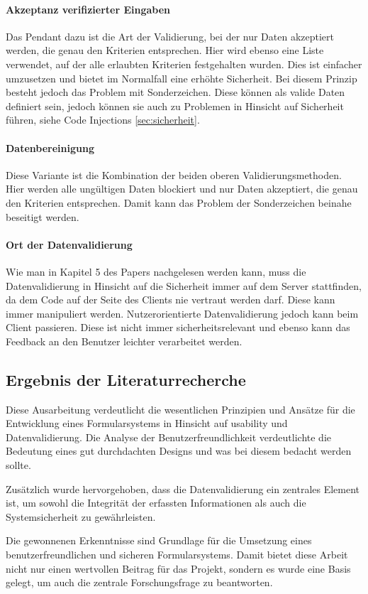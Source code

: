 \paragraph{Akzeptanz verifizierter Eingaben}
Das Pendant dazu ist die Art der Validierung, bei der nur Daten akzeptiert werden, die genau den Kriterien entsprechen. Hier wird ebenso eine Liste verwendet, auf der alle erlaubten Kriterien festgehalten wurden. Dies ist einfacher umzusetzen und bietet im Normalfall eine erhöhte Sicherheit. Bei diesem Prinzip besteht jedoch das Problem mit Sonderzeichen. Diese können als valide Daten definiert sein, jedoch können sie auch zu Problemen in Hinsicht auf Sicherheit führen, siehe Code Injections \ref{sec:sicherheit}.

\paragraph{Datenbereinigung}
Diese Variante ist die Kombination der beiden oberen Validierungsmethoden. Hier werden alle ungültigen Daten blockiert und nur Daten akzeptiert, die genau den Kriterien entsprechen. Damit kann das Problem der Sonderzeichen beinahe beseitigt werden.  

\paragraph{Ort der Datenvalidierung}
Wie man in Kapitel 5 des Papers \cite{DeVries2006} nachgelesen werden kann, muss die Datenvalidierung in Hinsicht auf die Sicherheit immer auf dem Server stattfinden, da dem Code auf der Seite des Clients nie vertraut werden darf. Diese kann immer manipuliert werden. Nutzerorientierte Datenvalidierung jedoch kann beim Client passieren. Diese ist nicht immer sicherheitsrelevant und ebenso kann das Feedback an den Benutzer leichter verarbeitet werden. 

\subsection{Ergebnis der Literaturrecherche}
Diese Ausarbeitung verdeutlicht die wesentlichen Prinzipien und Ansätze für die Entwicklung eines Formularsystems in Hinsicht auf \gls{usability} und Datenvalidierung. Die Analyse der Benutzerfreundlichkeit verdeutlichte die Bedeutung eines gut durchdachten Designs und was bei diesem bedacht werden sollte. 

Zusätzlich wurde hervorgehoben, dass die Datenvalidierung ein zentrales Element ist, um sowohl die Integrität der erfassten Informationen als auch die Systemsicherheit zu gewährleisten.

Die gewonnenen Erkenntnisse sind Grundlage für die Umsetzung eines benutzerfreundlichen und sicheren Formularsystems. Damit bietet diese Arbeit nicht nur einen wertvollen Beitrag für das Projekt, sondern es wurde eine Basis gelegt, um auch die zentrale Forschungsfrage zu beantworten. \cite{prompt10_pollak} \cite{prompt1_pollak}